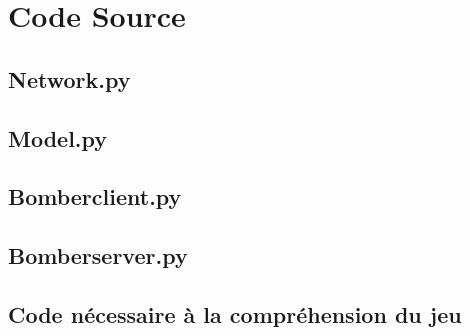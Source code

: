 \documentclass[a4paper]{article}
\begin{document}
\newpage
\section{Code Source}

\subsection{Network.py} \label{network.py}
\newpage

\subsection{Model.py} \label{model.py}

\newpage

\subsection{Bomber\textunderscore client.py} \label{bomber_client.py}

\newpage

\subsection{Bomber\textunderscore server.py} \label{bomber_server.py}

\newpage

\subsection{Code nécessaire à la compréhension du jeu}

\newpage

\end{document}
